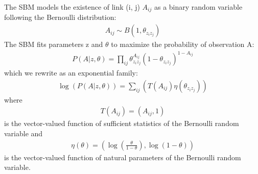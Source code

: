 \documentclass{article}
\begin{document}
The SBM models the existence of link (i, j) $ A_{ij} $ as a binary random variable following the Bernoulli distribution:
\begin{align*}
A_{ij} \sim B(1, \theta_{z_i z_j})
\end{align*}
The SBM fits parameters z and $ \theta $
to maximize the probability of observation A:
\begin{align*}
P(A|z, \theta) 
= \prod_{ij} \theta_{z_i z_j}^{A_{ij}}(1-\theta_{z_i z_j})^{1-A_{ij}}
\end{align*}
which we rewrite as an exponential family:
\begin{align*}
\log(P(A|z, \theta))
= \sum_{ij} (
T(A_{ij}) \eta(\theta_{z_i z_j})
)
\end{align*}
where
\begin{align*}
T(A_{ij}) = (A_{ij}, 1)
\end{align*}
is the vector-valued function of sufficient statistics of the Bernoulli random variable and
\begin{align*}
\eta(\theta) = ( \log(\frac{\theta}{1-\theta}), \log(1-\theta) )
\end{align*}
is the vector-valued function of natural parameters of the Bernoulli random variable.
\end{document}

